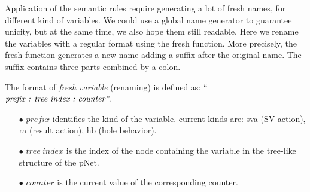 \documentclass{lncs/llncs}
\newcommand{\TODO}[1]{\textcolor{red}{\textbf{[TODO:#1]}}}
\begin{document}

Application of the semantic rules require generating a lot of fresh
names, for different kind of variables. We could use a global name
generator to guarantee unicity, but 
at the same time, we also hope them still
readable. Here we rename the variables with a regular format using the fresh function.
More precisely, the fresh function generates a new name adding a
suffix after the original name. The suffix contains three parts
combined by a colon.  


\begin{definition}\label{fresh-variable}
The format of \emph{fresh variable} (renaming) is defined as:
``$\emph{prefix : tree\ index\ :\ counter}$''.
\begin{itemize}
   \item[$\bullet$] $prefix$ identifies the kind of the
     variable. current kinds are: sva (SV action), ra (result action), hb (hole behavior).
   \item[$\bullet$] $tree\ index$ is the index of the node containing the variable in the tree-like structure of the pNet.
   \item[$\bullet$] $counter$ is the current value of the corresponding counter.
\end{itemize}
\end{definition}


\end{document}
